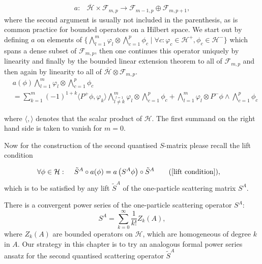 \documentclass[b5paper,draft,openbib,12pt]{memoir}
\begin{document}
\begin{align}
a: &\overline{\mathcal{H}}\times \mathcal{F}_{m,p} \rightarrow \mathcal{F}_{m-1,p}\oplus \mathcal{F}_{m,p+1},
\end{align}
where the second argument is usually not included in the parenthesis, as is 
common practice for bounded operators on a Hilbert space.
We start out by defining \(a\) on elements of 
\(\{\bigwedge_{l=1}^m \varphi_l \otimes \bigwedge_{c=1}^p \phi_c  \mid \forall c:  \varphi_c \in \mathcal{H}^+, \phi_c \in \mathcal{H}^-   \}\)
which spans a dense subset of \(\mathcal{F}_{m,p}\), then one continues this operator uniquely by 
linearity and finally by the bounded linear extension theorem to all of \(\mathcal{F}_{m,p}\) and then 
again by linearity to all of \(\overline{\mathcal{H}}\otimes \mathcal{F}_{m,p}\).
\begin{align}
&a(\phi)  \bigwedge_{l=1}^m \varphi_l \otimes \bigwedge_{c=1}^p \phi_c\\
&= \sum_{k=1}^m (-1)^{1+k} \langle P^+ \phi, \varphi_k\rangle \bigwedge_{\overset{l=1}{l\neq k}}^m \varphi_l \otimes \bigwedge_{c=1}^p \phi_c + \bigwedge_{l=1}^m \varphi_l \otimes P^- \phi \wedge \bigwedge_{c=1}^p \phi_c
\end{align}

where \(\langle, \rangle\) denotes that the scalar product of 
\(\mathcal{H}\). The first summand on the right hand side is 
taken to vanish for \(m=0\). 

Now for the construction of the second quantised 
\(S\)-matrix please 
recall the lift condition 

\begin{align}
\forall \phi\in \mathcal{H}:& \hspace{0.5cm} \tilde{S}^A \circ a(\phi)=a\left( S^A \phi \right)  \circ \tilde{S}^A\tag{\ref{lift condition}},
\end{align}
which is to be satisfied by any lift \(\tilde{S}^A\)  
of the one-particle scattering matrix \(S^A\).

There is a convergent power series of the one-particle 
scattering operator \(S^A\):
\begin{equation}\label{U_expansion}
S^A = \sum_{k=0}^\infty \frac{1}{k!} Z_k(A),
\end{equation}
where \(Z_k(A)\) are bounded operators on \(\mathcal{H}\), which are homogeneous of degree \(k\) in \(A\).
Our strategy in this chapter is to try an analogous formal 
power series ansatz for the second quantised scattering 
operator \(\tilde{S}^A\)
\end{document}
